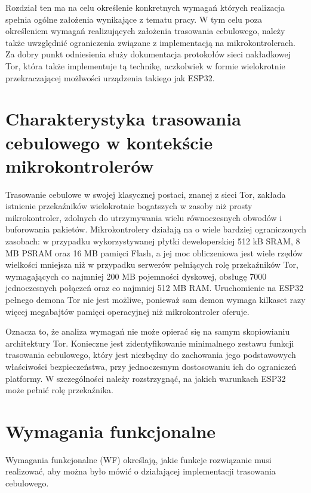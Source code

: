 \documentclass[thesis=inz,faculty=ee]{EE-dyplom}
\begin{document}
    Rozdział ten ma na celu określenie konkretnych wymagań których realizacja spełnia ogólne założenia wynikające z tematu pracy. W tym celu poza określeniem wymagań 
    realizujących założenia trasowania cebulowego, należy także uwzględnić ograniczenia związane z implementacją na mikrokontrolerach. Za dobry punkt odniesienia służy
    dokumentacja protokołów sieci nakładkowej Tor\cite{tor_spec}, która także implementuje tą technikę, aczkolwiek w formie wielokrotnie przekraczającej możlwości urządzenia takiego jak
    ESP32\cite{relay_requirement}. 

    \section{Charakterystyka trasowania cebulowego w kontekście mikrokontrolerów}

    Trasowanie cebulowe w swojej klasycznej postaci, znanej z sieci Tor, zakłada istnienie przekaźników wielokrotnie bogatszych w zasoby niż prosty mikrokontroler, 
    zdolnych do utrzymywania wielu równoczesnych obwodów i buforowania pakietów. Mikrokontrolery działają na o wiele bardziej ograniczonych zasobach: w przypadku 
    wykorzystywanej płytki deweloperskiej 512 kB SRAM, 8 MB PSRAM oraz 16 MB pamięci Flash, a jej moc obliczeniowa jest wiele rzędów wielkości mniejsza niż w przypadku 
    serwerów pełniących rolę przekaźników Tor, wymagających co najmniej 200 MB pojemności dyskowej, obsługę 7000 jednoczesnych połączeń oraz co najmniej 512 MB RAM\cite{relay_requirement}. 
    Uruchomienie na ESP32 pełnego demona Tor nie jest możliwe, ponieważ sam demon wymaga kilkaset razy więcej megabajtów 
    pamięci operacyjnej niż mikrokontroler oferuje.

    Oznacza to, że analiza wymagań nie może opierać się na samym skopiowianiu architektury Tor. Konieczne jest zidentyfikowanie minimalnego zestawu funkcji trasowania 
    cebulowego, który jest niezbędny do zachowania jego podstawowych właściwości bezpieczeństwa, przy jednoczesnym dostosowaniu ich do ograniczeń platformy. W szczególności 
    należy rozstrzygnąć, na jakich warunkach ESP32 może pełnić rolę przekaźnika.

    \section{Wymagania funkcjonalne}

    Wymagania funkcjonalne (WF) określają, jakie funkcje rozwiązanie musi realizować, aby można było mówić o działającej implementacji trasowania cebulowego.
\end{document}
